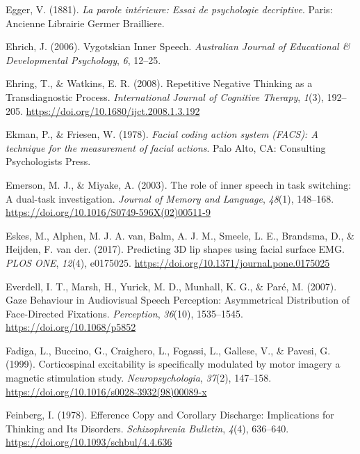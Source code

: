 \documentclass[a4paper,12pt,twoside,openright,oldfontcommands]{memoir}
\begin{document}
\leavevmode\hypertarget{ref-egger_parole_1881}{}%
Egger, V. (1881). \emph{La parole intérieure: Essai de psychologie decriptive}. Paris: Ancienne Librairie Germer Brailliere.

\leavevmode\hypertarget{ref-ehrich_vygotskian_2006}{}%
Ehrich, J. (2006). Vygotskian Inner Speech. \emph{Australian Journal of Educational \& Developmental Psychology}, \emph{6}, 12--25.

\leavevmode\hypertarget{ref-ehring_repetitive_2008}{}%
Ehring, T., \& Watkins, E. R. (2008). Repetitive Negative Thinking as a Transdiagnostic Process. \emph{International Journal of Cognitive Therapy}, \emph{1}(3), 192--205. \url{https://doi.org/10.1680/ijct.2008.1.3.192}

\leavevmode\hypertarget{ref-ekman_facial_1978}{}%
Ekman, P., \& Friesen, W. (1978). \emph{Facial coding action system (FACS): A technique for the measurement of facial actions}. Palo Alto, CA: Consulting Psychologists Press.

\leavevmode\hypertarget{ref-emerson_role_2003}{}%
Emerson, M. J., \& Miyake, A. (2003). The role of inner speech in task switching: A dual-task investigation. \emph{Journal of Memory and Language}, \emph{48}(1), 148--168. \url{https://doi.org/10.1016/S0749-596X(02)00511-9}

\leavevmode\hypertarget{ref-eskes_predicting_2017}{}%
Eskes, M., Alphen, M. J. A. van, Balm, A. J. M., Smeele, L. E., Brandsma, D., \& Heijden, F. van der. (2017). Predicting 3D lip shapes using facial surface EMG. \emph{PLOS ONE}, \emph{12}(4), e0175025. \url{https://doi.org/10.1371/journal.pone.0175025}

\leavevmode\hypertarget{ref-everdell_gaze_2007}{}%
Everdell, I. T., Marsh, H., Yurick, M. D., Munhall, K. G., \& Paré, M. (2007). Gaze Behaviour in Audiovisual Speech Perception: Asymmetrical Distribution of Face-Directed Fixations. \emph{Perception}, \emph{36}(10), 1535--1545. \url{https://doi.org/10.1068/p5852}

\leavevmode\hypertarget{ref-fadiga_corticospinal_1999}{}%
Fadiga, L., Buccino, G., Craighero, L., Fogassi, L., Gallese, V., \& Pavesi, G. (1999). Corticospinal excitability is specifically modulated by motor imagery a magnetic stimulation study. \emph{Neuropsychologia}, \emph{37}(2), 147--158. \url{https://doi.org/10.1016/s0028-3932(98)00089-x}

\leavevmode\hypertarget{ref-feinberg_efference_1978}{}%
Feinberg, I. (1978). Efference Copy and Corollary Discharge: Implications for Thinking and Its Disorders. \emph{Schizophrenia Bulletin}, \emph{4}(4), 636--640. \url{https://doi.org/10.1093/schbul/4.4.636}
\end{document}
